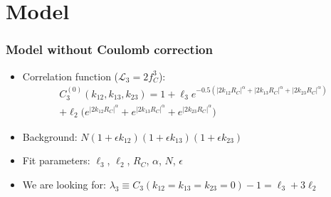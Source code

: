 \documentclass{beamer}
\begin{document}
\section{Model}
\begin{frame}
\frametitle{Model without Coulomb correction}
\begin{itemize}
\setlength{\itemsep}{22pt}

\item Correlation function ($\mathcal{L}_3=2f_C^3$):
\begin{align*}
C_3^{(0)}(k_{12}, k_{13}, k_{23}) = 1+ \ell_3e^{-0.5(|2k_{12}R_C|^\alpha+|2k_{13}R_C|^\alpha+|2k_{23}R_C|^\alpha)}\nonumber\\
+\ell_2\bigg(e^{|2k_{12}R_C|^\alpha}+e^{|2k_{13}R_C|^\alpha}+e^{|2k_{23}R_C|^\alpha}\bigg)
\end{align*}
\item Background: $N(1+\epsilon k_{12})(1+\epsilon k_{13})(1+\epsilon k_{23})$
\item Fit parameters: $\ell_3$, $\ell_2$,  $R_C$, $\alpha$, $N$, $\epsilon$
\item We are looking for: $\lambda_3 \equiv  C_3(k_{12}=k_{13}=k_{23}=0)-1=\ell_3+3\ell_2$
\end{itemize}
\end{frame}
\end{document}
